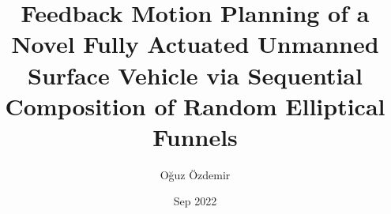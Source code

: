 \documentclass[chaparabic,ee,ms,12pt,oneandhalf,fivejury]{METUThesisTemplate/metu}
\author{Oğuz Özdemir}
\title{Feedback Motion Planning of a Novel Fully Actuated Unmanned Surface Vehicle via Sequential Composition of Random Elliptical Funnels}
\date{Sep 2022}
\begin{document}
\begin{preliminaries}

    
\end{preliminaries}
%   
% 
%

\setlength{\parindent}{0em}
\setlength{\parskip}{10pt}










%
%

%

% 
\end{document}
